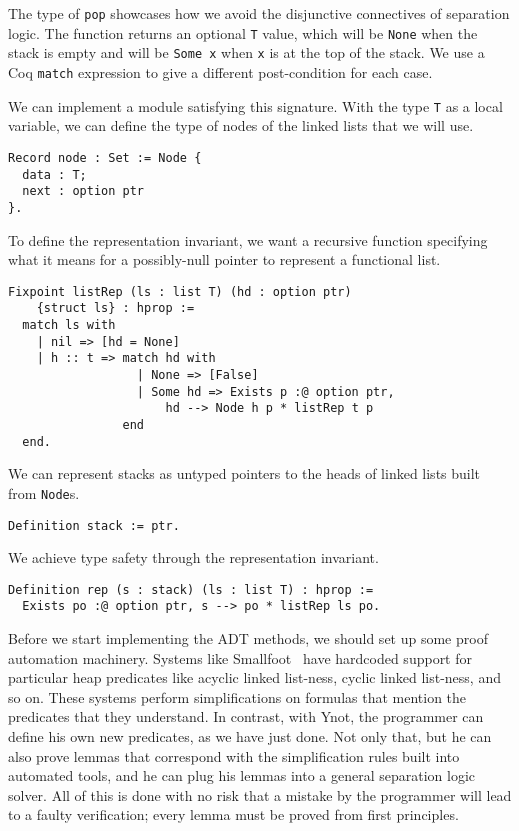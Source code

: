 \documentclass[preprint,nocopyrightspace]{sigplanconf}
\newcommand{\cd}[1]{\texttt{#1}}
\begin{document}
The type of \cd{pop} showcases how we avoid the disjunctive connectives of separation logic.  The function returns an optional \cd{T} value, which will be \cd{None} when the stack is empty and will be \cd{Some x} when \cd{x} is at the top of the stack.  We use a Coq \cd{match} expression to give a different post-condition for each case.

\medskip

We can implement a module satisfying this signature.  With the type \cd{T} as a local variable, we can define the type of nodes of the linked lists that we will use.

\begin{verbatim}
Record node : Set := Node {
  data : T;
  next : option ptr
}.
\end{verbatim}

To define the representation invariant, we want a recursive function specifying what it means for a possibly-null pointer to represent a functional list.

\begin{verbatim}
Fixpoint listRep (ls : list T) (hd : option ptr)
    {struct ls} : hprop :=
  match ls with
    | nil => [hd = None]
    | h :: t => match hd with
                  | None => [False]
                  | Some hd => Exists p :@ option ptr,
                      hd --> Node h p * listRep t p
                end
  end.
\end{verbatim}

We can represent stacks as untyped pointers to the heads of linked lists built from \cd{Node}s.

\begin{verbatim}
Definition stack := ptr.
\end{verbatim}

We achieve type safety through the representation invariant.

\begin{verbatim}
Definition rep (s : stack) (ls : list T) : hprop :=
  Exists po :@ option ptr, s --> po * listRep ls po.
\end{verbatim}

Before we start implementing the ADT methods, we should set up some proof automation machinery.  Systems like Smallfoot~\cite{smallfoot} have hardcoded support for particular heap predicates like acyclic linked list-ness, cyclic linked list-ness, and so on.  These systems perform simplifications on formulas that mention the predicates that they understand.  In contrast, with Ynot, the programmer can define his own new predicates, as we have just done.  Not only that, but he can also prove lemmas that correspond with the simplification rules built into automated tools, and he can plug his lemmas into a general separation logic solver.  All of this is done with no risk that a mistake by the programmer will lead to a faulty verification; every lemma must be proved from first principles.
\end{document}
